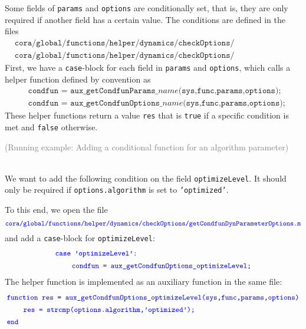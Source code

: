 Some fields of \texttt{params} and \texttt{options} are conditionally set, that is, they are only required if another field has a certain value.
The conditions are defined in the files
\begin{align*}
	&\texttt{cora/global/functions/helper/dynamics/checkOptions/getCondfunDynParameterParams.m} \\
	&\texttt{cora/global/functions/helper/dynamics/checkOptions/getCondfunDynParameterOptions.m}
\end{align*}
First, we have a \texttt{case}-block for each field in \texttt{params} and \texttt{options}, which calls a helper function defined by convention as
\begin{align*}
	&\texttt{condfun = aux\_getCondfunParams\_}\textit{name}\texttt{(sys,func,params,options);} \\
	&\texttt{condfun = aux\_getCondfunOptions\_}\textit{name}\texttt{(sys,func,params,options);}
\end{align*}
These helper functions return a value \texttt{res} that is \texttt{true} if a specific condition is met and \texttt{false} otherwise.


\begin{tcolorbox}
	\begin{scriptsize} \textcolor{gray}{(Running example: Adding a conditional function for an algorithm parameter)} \end{scriptsize} \\
	We want to add the following condition on the field \texttt{optimizeLevel}.
	It should only be required if \texttt{options.algorithm} is set to \texttt{'optimized'}.

	To this end, we open the file
	\begin{equation*}
		\textcolor{blue}{\small{\texttt{cora/global/functions/helper/dynamics/checkOptions/getCondfunDynParameterOptions.m}}}
	\end{equation*}
	and add a \texttt{case}-block for \texttt{optimizeLevel}:
	\begin{align*}
		&		\textcolor{blue}{\small{\texttt{case 'optimizeLevel':}}} \\
		&\qquad \textcolor{blue}{\small{\texttt{condfun = aux\_getCondfunOptions\_optimizeLevel;}}}
	\end{align*}
	The helper function is implemented as an auxiliary function in the same file:
	\begin{align*}
		&		\textcolor{blue}{\small{\texttt{function res = aux\_getCondfunOptions\_optimizeLevel(sys,func,params,options)}}} \\
    	&\qquad \textcolor{blue}{\small{\texttt{res = strcmp(options.algorithm,'optimized');}}} \\
		&		\textcolor{blue}{\small{\texttt{end}}}
	\end{align*}
\end{tcolorbox}


